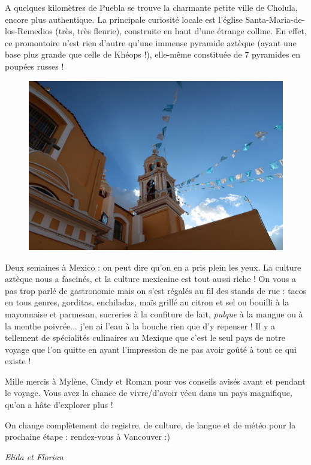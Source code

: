 A quelques kilomètres de Puebla se trouve la charmante petite ville de
Cholula, encore plus authentique. La principale curiosité locale est
l'église Santa-Maria-de-los-Remedios (très, très fleurie), construite en
haut d'une étrange colline. En effet, ce promontoire n'est rien d'autre
qu'une immense pyramide aztèque (ayant une base plus grande que celle de
Khéops !), elle-même constituée de 7 pyramides en poupées russes !

\begin{figure}
\centering
\includegraphics{images/20180930_cholula.JPG}
\caption{}
\end{figure}

Deux semaines à Mexico : on peut dire qu'on en a pris plein les yeux. La
culture aztèque nous a fascinés, et la culture mexicaine est tout aussi
riche ! On vous a pas trop parlé de gastronomie mais on s'est régalés au
fil des stands de rue : tacos en tous genres, gorditas, enchiladas, maïs
grillé au citron et sel ou bouilli à la mayonnaise et parmesan,
sucreries à la confiture de lait, \emph{pulque} à la mangue ou à la
menthe poivrée... j'en ai l'eau à la bouche rien que d'y repenser ! Il y
a tellement de spécialités culinaires au Mexique que c'est le seul pays
de notre voyage que l'on quitte en ayant l'impression de ne pas avoir
goûté à tout ce qui existe !

Mille mercis à Mylène, Cindy et Roman pour vos conseils avisés avant et
pendant le voyage. Vous avez la chance de vivre/d'avoir vécu dans un
pays magnifique, qu'on a hâte d'explorer plus !

On change complètement de registre, de culture, de langue et de météo
pour la prochaine étape : rendez-vous à Vancouver :)

\emph{Elida et Florian}
